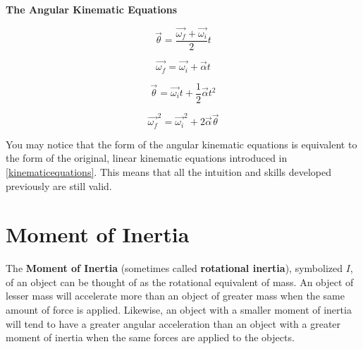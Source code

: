 	\begin{mdframed}[backgroundcolor=orange!20!white]
		\begin{center}
			\textbf{The Angular Kinematic Equations}
		\end{center}
		\begin{multicols}{2}
			\begin{equation}
				\vec{\theta} = \frac{\overrightarrow{\omega_f} + \overrightarrow{\omega_i}}{2}  t
				\label{equation:akinematic1}
			\end{equation}
			
			\begin{equation}
				\overrightarrow{\omega_f} = \overrightarrow{\omega_i} + \vec{\alpha} t
				\label{equation:akinematic2}
			\end{equation}	
			
			\begin{equation}
				\vec{\theta} = \overrightarrow{\omega_i} t + \frac{1}{2}\vec{\alpha}{t}^2
				\label{equation:akinematic3}
			\end{equation}
			
			\begin{equation}
				\overrightarrow{\omega_f}^2 = \overrightarrow{\omega_i}^2 + 2\vec{\alpha}\vec{\theta}
				\label{equation:akinematic4}
			\end{equation}
			
			
			
		\end{multicols}
	\end{mdframed}
	
	You may notice that the form of the angular kinematic equations is equivalent to the form of the original, linear kinematic equations introduced in \cref{kinematicequations}. This means that all the intuition and skills developed previously are still valid.   
	
	

	\section{Moment of Inertia}
	  
	The \textbf{Moment of Inertia} (sometimes called \textbf{rotational inertia}), symbolized $I$, of an object can be thought of as the rotational equivalent of mass.  An object of lesser mass will accelerate more than an object of greater mass when the same amount of force is applied.  Likewise, an object with a smaller moment of inertia will tend to have a greater angular acceleration than an object with a greater moment of inertia when the same forces are applied to the objects.  
	
